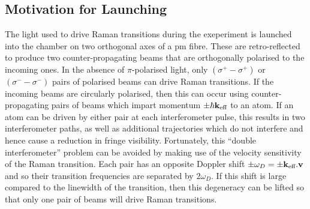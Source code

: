 \subsection{Motivation for Launching}
The light used to drive Raman transitions during the exeperiment is launched into the chamber on two orthogonal axes of a \ac{pm} fibre. These are retro-reflected to produce two counter-propagating beams that are orthogonally polarised to the incoming ones. In the absence of \(\pi\)-polarised light, only \((\sigma^+-\sigma^+)\) or \((\sigma^--\sigma^-)\) pairs of polarised beams can drive Raman transitions. If the incoming beams are circularly polarised, then this can occur using counter-propagating pairs of beams which impart momentum \(\pm \hbar {\textbf k_\textnormal{eff}}\) to an atom. If an atom can be driven by either pair at each interferometer pulse, this results in two interferometer paths, as well as additional trajectories which do not interfere and hence cause a reduction in fringe visibility. Fortunately, this ``double interferometer'' problem can be avoided by making use of the velocity sensitivity of the Raman transition. Each pair has an opposite Doppler shift \(\pm \omega_D = \pm {\textbf k_\textnormal{eff}}.\textbf{v}\) and so their transition frequencies are separated by \(2\omega_D\). If this shift is large compared to the linewidth of the transition, then this degeneracy can be lifted so that only one pair of beams will drive Raman transitions.

